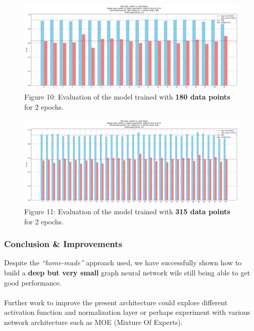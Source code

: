 \documentclass[11pt]{article}
\begin{document}
	\begin{figure}[h!] %
		\centering
		\includegraphics[width=1\textwidth]{images/test_auc_20_gat_model_v1_ReLU_LayerNorm_128_64_4x2_d_0.75_180_2_20250202-112112.jpg}
		\caption{Figure 10: Evaluation of the model trained with \textbf{180 data points} for 2 epochs.}
		\label{figure_10}
	\end{figure}
	
	\begin{figure}[h!] %
		\centering
		\includegraphics[width=1\textwidth]{images/test_auc_35_gat_model_v1_ReLU_LayerNorm_128_64_4x2_d_0.75_315_2_20250202-134130.jpg}
		\caption{Figure 11: Evaluation of the model trained with \textbf{315 data points} for 2 epochs.}
		\label{figure_11}
	\end{figure}
	
	\clearpage
	\subsubsection{Conclusion \& Improvements}
	Despite the \textit{``home-made''} approach used, we have successfully shown how to build a \textbf{deep but very small} graph neural network wile still being able to get good performance.\\\\
	Further work to improve the present architecture could explore different activation function and normalization layer or perhaps experiment with various network architecture such as MOE (Mixture Of Experts).       
\end{document}
